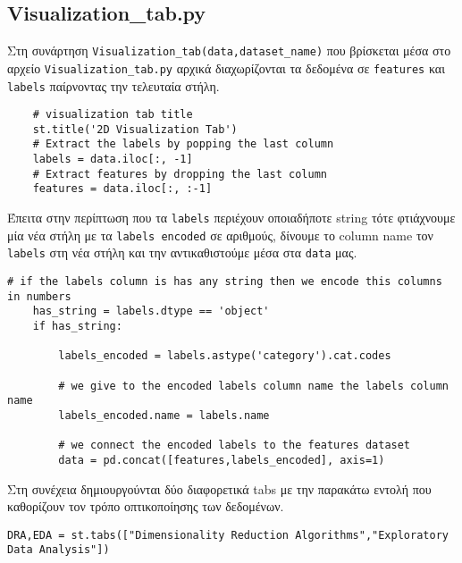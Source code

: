 \documentclass[a4paper,12pt]{article}
\begin{document}
\subsection{Visualization\_tab.py}
Στη συνάρτηση \texttt{Visualization\_tab(data,dataset\_name)} που βρίσκεται μέσα στο αρχείο \texttt{Visualization\_tab.py} αρχικά διαχωρίζονται τα δεδομένα σε \texttt{features} και \texttt{labels} παίρνοντας την τελευταία στήλη.
\begin{lstlisting}
    # visualization tab title
    st.title('2D Visualization Tab')
    # Extract the labels by popping the last column
    labels = data.iloc[:, -1]
    # Extract features by dropping the last column
    features = data.iloc[:, :-1]
\end{lstlisting}
Έπειτα στην περίπτωση που τα \texttt{labels} περιέχουν οποιαδήποτε string τότε φτιάχνουμε μία νέα στήλη με τα \texttt{labels encoded} σε αριθμούς, δίνουμε το column name  τον \texttt{labels} στη νέα στήλη και την αντικαθιστούμε μέσα στα \texttt{data} μας.
\begin{lstlisting}
# if the labels column is has any string then we encode this columns in numbers
    has_string = labels.dtype == 'object'
    if has_string:
        
        labels_encoded = labels.astype('category').cat.codes
        
        # we give to the encoded labels column name the labels column name
        labels_encoded.name = labels.name
        
        # we connect the encoded labels to the features dataset
        data = pd.concat([features,labels_encoded], axis=1)
\end{lstlisting}

Στη συνέχεια δημιουργούνται δύο διαφορετικά tabs με την παρακάτω εντολή που καθορίζουν τον τρόπο οπτικοποίησης των δεδομένων.

\begin{lstlisting}
DRA,EDA = st.tabs(["Dimensionality Reduction Algorithms","Exploratory Data Analysis"])
\end{lstlisting}
\end{document}
